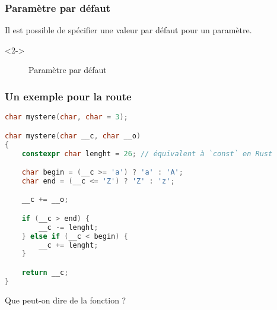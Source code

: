 \documentclass{cppcourses}
\begin{document}
\begin{frame}

\frametitle{Paramètre par défaut}

Il est possible de spécifier une valeur par défaut pour un paramètre.

\begin{uncoverenv}<2->

\begin{figure}
\mykeyword{\textcolor{orange}{<type>} \textcolor{magenta}{[identificateur]} = \textcolor{blue}{<valeur par défaut>}}
\caption{Paramètre par défaut}
\end{figure}

\end{uncoverenv}


\end{frame}

\begin{frame}[fragile]

\frametitle{Un exemple pour la route}

\begin{example}

\begin{lstlisting}[language = c++]
char mystere(char, char = 3);

char mystere(char __c, char __o)
{
    constexpr char lenght = 26; // équivalent à `const` en Rust

    char begin = (__c >= 'a') ? 'a' : 'A';
    char end = (__c <= 'Z') ? 'Z' : 'z';

    __c += __o;

    if (__c > end) {
        __c -= lenght;
    } else if (__c < begin) {
        __c += lenght;
    }

    return __c;
}
\end{lstlisting}

Que peut-on dire de la fonction  ?


\end{example}

\end{frame}
\end{document}
